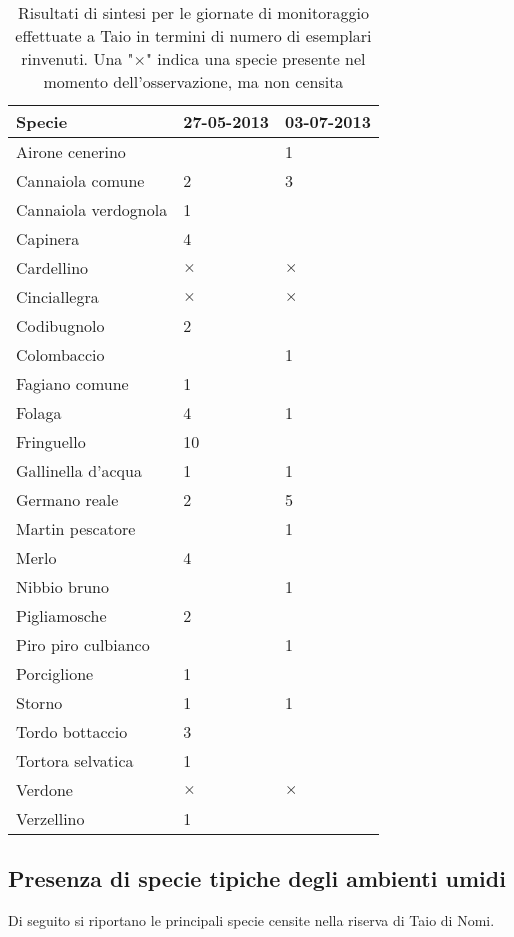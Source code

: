 \documentclass[11pt,a4paper,twoside]{memoir}
\begin{document}
\begin{table}[H]
\centering
\begin{tabular}{lll}
\toprule
\textbf{  Specie  } & \textbf{  27-05-2013  } & \textbf{  03-07-2013  } \\
\midrule
  Airone cenerino &   & 1 \\
  Cannaiola comune  & 2 & 3 \\
  Cannaiola verdognola  & 1 &   \\
  Capinera  & 4 &   \\
  Cardellino  & $\times$ & $\times$ \\
  Cinciallegra  & $\times$ & $\times$ \\
  Codibugnolo & 2 &   \\
  Colombaccio &   & 1 \\
  Fagiano comune  & 1 &   \\
  Folaga  & 4 & 1 \\
  Fringuello  & 10  &   \\
  Gallinella d'acqua  & 1 & 1 \\
  Germano reale & 2 & 5 \\
  Martin pescatore  &   & 1 \\
  Merlo & 4 &   \\
  Nibbio bruno  &   & 1 \\
  Pigliamosche  & 2 &   \\
  Piro piro culbianco &   & 1 \\
  Porciglione & 1 &   \\
  Storno  & 1 & 1 \\
  Tordo bottaccio & 3 &   \\
  Tortora selvatica & 1 &   \\
  Verdone & $\times$ & $\times$ \\
  Verzellino  & 1 &   \\
\bottomrule
\end{tabular}
\caption{Risultati di sintesi per le giornate di monitoraggio effettuate a Taio in termini di numero di esemplari rinvenuti. Una "$\times$" indica una specie presente nel momento dell'osservazione, ma non censita}
\end{table}

\subsection{Presenza di specie tipiche degli ambienti umidi}
Di seguito si riportano le principali specie censite nella riserva di Taio di Nomi.
\end{document}
